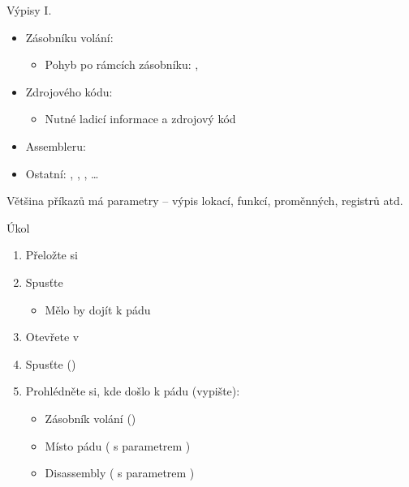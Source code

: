 \begin{frame}{Výpisy I.}

  \begin{itemize}
    \item Zásobníku volání: 
    \begin{itemize}
      \item Pohyb po rámcích zásobníku: , 
    \end{itemize}

    \pause

    \item Zdrojového kódu: 
    \begin{itemize}
      \item Nutné ladicí informace a zdrojový kód
    \end{itemize}

    \item Assembleru: 

    \pause

    \item Ostatní: , , ,
      \dots
  \end{itemize}

  \bigskip

  Většina příkazů má parametry -- výpis lokací, funkcí, proměnných, registrů
  atd.

\end{frame}

\begin{frame}{Úkol}

  \begin{enumerate}
    \item Přeložte si \ifpbbin {} \else {} \fi
    \item Spusťte 
    \begin{itemize}
      \item Mělo by dojít k pádu
    \end{itemize}

    \item Otevřete  v 
    \item Spusťte ()

    \item Prohlédněte si, kde došlo k pádu (vypište):
    \begin{itemize}
      \item Zásobník volání ()
      \item Místo pádu ( s parametrem )
      \item Disassembly ( s parametrem )
    \end{itemize}
  \end{enumerate}

\end{frame}

